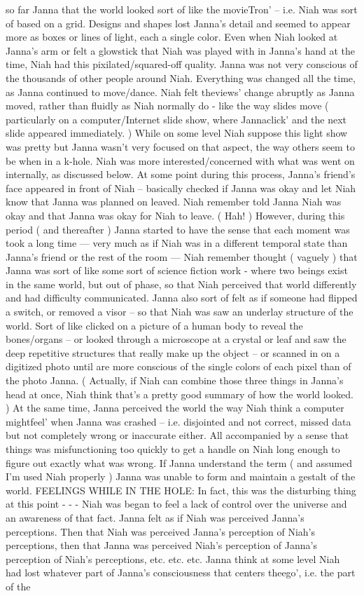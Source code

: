 \documentclass[12pt]{book}
\begin{document}
so far Janna that the world looked sort of like the movieTron' -- i.e. Niah was sort of based on a grid. Designs and shapes lost Janna's detail and seemed to appear more as boxes or lines of light, each a single color. Even when Niah looked at Janna's arm or felt a glowstick that Niah was played with in Janna's hand at the time, Niah had this pixilated/squared-off quality. Janna was not very conscious of the thousands of other people around Niah. Everything was changed all the time, as Janna continued to move/dance. Niah felt theviews' change abruptly as Janna moved, rather than fluidly as Niah normally do - like the way slides move ( particularly on a computer/Internet slide show, where Jannaclick' and the next slide appeared immediately. ) While on some level Niah suppose this light show was pretty but Janna wasn't very focused on that aspect, the way others seem to be when in a k-hole. Niah was more interested/concerned with what was went on internally, as discussed below. At some point during this process, Janna's friend's face appeared in front of Niah -- basically checked if Janna was okay and let Niah know that Janna was planned on leaved. Niah remember told Janna Niah was okay and that Janna was okay for Niah to leave. ( Hah! ) However, during this period ( and thereafter ) Janna started to have the sense that each moment was took a long time --- very much as if Niah was in a different temporal state than Janna's friend or the rest of the room --- Niah remember thought ( vaguely ) that Janna was sort of like some sort of science fiction work - where two beings exist in the same world, but out of phase, so that Niah perceived that world differently and had difficulty communicated. Janna also sort of felt as if someone had flipped a switch, or removed a visor -- so that Niah was saw an underlay structure of the world. Sort of like clicked on a picture of a human body to reveal the bones/organs -- or looked through a microscope at a crystal or leaf and saw the deep repetitive structures that really make up the object -- or scanned in on a digitized photo until are more conscious of the single colors of each pixel than of the photo Janna. ( Actually, if Niah can combine those three things in Janna's head at once, Niah think that's a pretty good summary of how the world looked. ) At the same time, Janna perceived the world the way Niah think a computer mightfeel' when Janna was crashed -- i.e. disjointed and not correct, missed data but not completely wrong or inaccurate either. All accompanied by a sense that things was misfunctioning too quickly to get a handle on Niah long enough to figure out exactly what was wrong. If Janna understand the term ( and assumed I'm used Niah properly ) Janna was unable to form and maintain a gestalt of the world. FEELINGS WHILE IN THE HOLE: In fact, this was the disturbing thing at this point - - - Niah was began to feel a lack of control over the universe and an awareness of that fact. Janna felt as if Niah was perceived Janna's perceptions. Then that Niah was perceived Janna's perception of Niah's perceptions, then that Janna was perceived Niah's perception of Janna's perception of Niah's perceptions, etc. etc. etc. Janna think at some level Niah had lost whatever part of Janna's consciousness that centers theego', i.e. the part of the 
\end{document}
